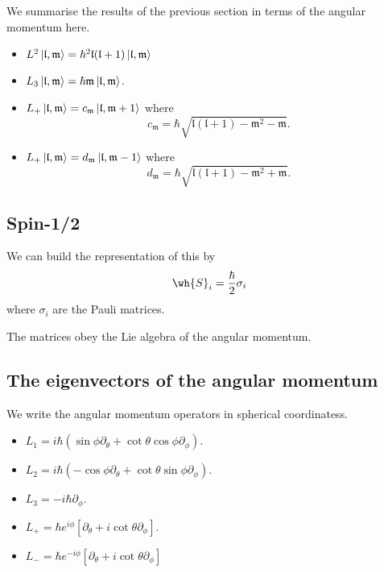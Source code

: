 \documentclass[12pt, a4paper]{article}
\begin{document}
\begin{mdthm}
    We summarise the results of the previous section in terms of the angular momentum here.
    \begin{itemize}
        \item \(L^2 \ket{\mathfrak{l},\mathfrak{m}} = \hbar^2\mathfrak{l}(\mathfrak{l}+1)\ket{\mathfrak{l},\mathfrak{m}}\)
        \item \(L_3 \ket{\mathfrak{l},\mathfrak{m}}=\hbar \mathfrak{m}\ket{\mathfrak{l},\mathfrak{m}}\).
        \item \(L_+\ket{\mathfrak{l},\mathfrak{m}} = c_{\mathfrak{m}}\ket{\mathfrak{l},\mathfrak{m}+1}\) where 
        \[c_{\mathfrak{m}} = \hbar \sqrt{\mathfrak{l}(\mathfrak{l}+1)-\mathfrak{m}^2-\mathfrak{m}}.\]
        \item \(L_+\ket{\mathfrak{l},\mathfrak{m}} = d_{\mathfrak{m}}\ket{\mathfrak{l},\mathfrak{m}-1}\) where 
        \[d_{\mathfrak{m}} = \hbar \sqrt{\mathfrak{l}(\mathfrak{l}+1)-\mathfrak{m}^2+\mathfrak{m}}.\]
    \end{itemize}
\end{mdthm}

\subsection{Spin-1/2}

\begin{mdprop}
    We can build the representation of this by 
    \[\wh{S}_i = \frac{\hbar}{2} \sigma_i\]
    where \(\sigma_i\) are the Pauli matrices.
\end{mdprop}

\begin{mdnote}
    The matrices obey the Lie algebra of the angular momentum.
\end{mdnote}

\subsection{The eigenvectors of the angular momentum}

\begin{mdprop}
    We write the angular momentum operators in spherical coordinatess.
    \begin{itemize}
        \item \(L_1 = i\hbar \left( \sin\phi\partial_\theta +\cot\theta\cos\phi\partial_{\phi} \right)\).
        \item \(L_2 = i\hbar \left( -\cos\phi\partial_\theta+\cot\theta\sin\phi\partial_\phi \right)\).
        \item \(L_3= -i\hbar\partial_\phi\).
        \item \(L_+ = \hbar e^{i\phi}\left[ \partial_\theta+i\cot\theta \partial_\phi \right]\).
        \item \(L_- = \hbar e^{-i\phi}\left[ \partial_\theta+i\cot\theta \partial_\phi \right]\)
    \end{itemize}
\end{mdprop}
\end{document}
